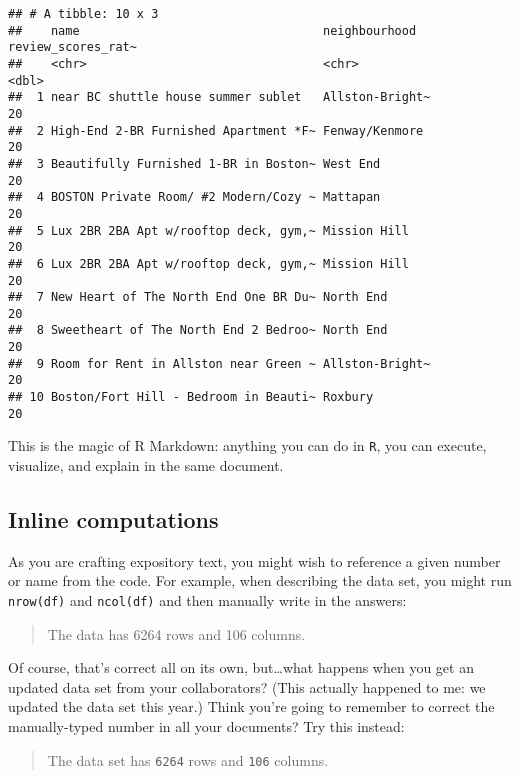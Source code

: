 \documentclass[]{article}
\begin{document}
\begin{verbatim}
## # A tibble: 10 x 3
##    name                                  neighbourhood   review_scores_rat~
##    <chr>                                 <chr>                        <dbl>
##  1 near BC shuttle house summer sublet   Allston-Bright~                 20
##  2 High-End 2-BR Furnished Apartment *F~ Fenway/Kenmore                  20
##  3 Beautifully Furnished 1-BR in Boston~ West End                        20
##  4 BOSTON Private Room/ #2 Modern/Cozy ~ Mattapan                        20
##  5 Lux 2BR 2BA Apt w/rooftop deck, gym,~ Mission Hill                    20
##  6 Lux 2BR 2BA Apt w/rooftop deck, gym,~ Mission Hill                    20
##  7 New Heart of The North End One BR Du~ North End                       20
##  8 Sweetheart of The North End 2 Bedroo~ North End                       20
##  9 Room for Rent in Allston near Green ~ Allston-Bright~                 20
## 10 Boston/Fort Hill - Bedroom in Beauti~ Roxbury                         20
\end{verbatim}

This is the magic of R Markdown: anything you can do in \texttt{R}, you
can execute, visualize, and explain in the same document.

\hypertarget{inline-computations}{%
\subsection{Inline computations}\label{inline-computations}}

As you are crafting expository text, you might wish to reference a given
number or name from the code. For example, when describing the data set,
you might run \texttt{nrow(df)} and \texttt{ncol(df)} and then manually
write in the answers:

\begin{quote}
The data has 6264 rows and 106 columns.
\end{quote}

Of course, that's correct all on its own, but\ldots{}what happens when
you get an updated data set from your collaborators? (This actually
happened to me: we updated the data set this year.) Think you're going
to remember to correct the manually-typed number in all your documents?
Try this instead:

\begin{quote}
The data set has \texttt{6264} rows and \texttt{106} columns.
\end{quote}
\end{document}

